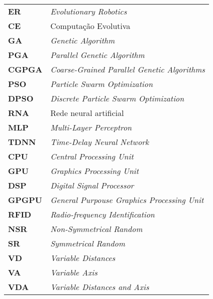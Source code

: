 \begin{tabular}[H]{l l}
    \textbf{ER} & \textit{Evolutionary Robotics} \\
    \textbf{CE} & Computação Evolutiva \\
    \textbf{GA} & \textit{Genetic Algorithm} \\
    \textbf{PGA} & \textit{Parallel Genetic Algorithm} \\
    \textbf{CGPGA} & \textit{Coarse-Grained Parallel Genetic Algorithms} \\
    \textbf{PSO} & \textit{Particle Swarm Optimization} \\
    \textbf{DPSO} & \textit{Discrete Particle Swarm Optimization} \\
    \textbf{RNA} & Rede neural artificial \\
    \textbf{MLP} & \textit{Multi-Layer Perceptron} \\
    \textbf{TDNN} & \textit{Time-Delay Neural Network} \\
    \textbf{CPU} & \textit{Central Processing Unit} \\
    \textbf{GPU} & \textit{Graphics Processing Unit} \\
    \textbf{DSP} & \textit{Digital Signal Processor} \\
    \textbf{GPGPU} & \textit{General Purpouse Graphics Processing Unit} \\
    \textbf{RFID} & \textit{Radio-frequency Identification} \\
    \textbf{NSR} & \textit{Non-Symmetrical Random} \\
    \textbf{SR} & \textit{Symmetrical Random} \\
    \textbf{VD} & \textit{Variable Distances} \\
    \textbf{VA} & \textit{Variable Axis} \\
    \textbf{VDA} & \textit{Variable Distances and Axis} \\
\end{tabular}